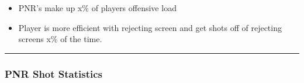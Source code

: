 \documentclass[a4paper,12pt]{article}
\begin{document}
\begin{itemize}
    \item PNR's make up x\% of players offensive load
    \vspace{0.3em} %
    \item Player is more efficient with rejecting screen and get shots off of rejecting screens x\% of the time.
\end{itemize}

\vspace{1em} %
\hrule height 1pt width 1\textwidth %
\vspace{0em} %

\subsubsection{PNR Shot Statistics}
\end{document}
